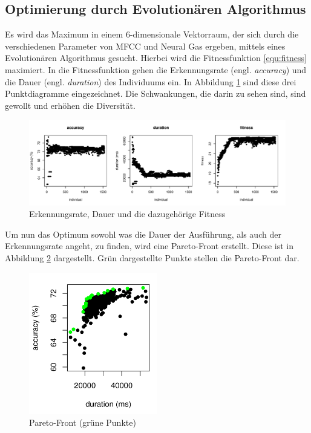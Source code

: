 \subsection{Optimierung durch Evolutionären Algorithmus}
Es wird das Maximum in einem 6-dimensionale Vektorraum, der sich durch die verschiedenen Parameter von MFCC und Neural Gas ergeben, mittels eines Evolutionären Algorithmus gesucht. Hierbei wird die Fitnessfunktion \ref{equ:fitness} maximiert. In die Fitnessfunktion gehen die Erkennungsrate (engl. \emph{accuracy}) und die Dauer (engl. \emph{duration}) des Individuums ein. In Abbildung \ref{fig:ea1} sind diese drei Punktdiagramme eingezeichnet. Die Schwankungen, die darin zu sehen sind, sind gewollt und erhöhen die Diversität.

\begin{figure}[h]
	\label{fig:ea1}
	\centering
	\includegraphics[width=1\textwidth]{images/ea1}
	\caption{Erkennungsrate, Dauer und die dazugehörige Fitness}
\end{figure}

Um nun das Optimum sowohl was die Dauer der Ausführung, als auch der Erkennungsrate angeht, zu finden, wird eine Pareto-Front erstellt. Diese ist in Abbildung \ref{fig:ea2} dargestellt. Grün dargestellte Punkte stellen die Pareto-Front dar.

\begin{figure}[h]
	\label{fig:ea2}
	\centering
	\includegraphics[width=0.5\textwidth]{images/ea2}
	\caption{Pareto-Front (grüne Punkte)}
\end{figure}

